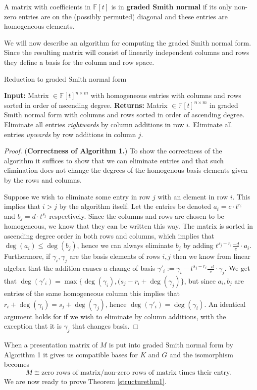 \begin{definition}
A matrix with coefficients in $\mathbb{F}[t]$ is in \textbf{graded Smith normal} if its only non-zero entries are on the (possibly permuted) diagonal and these entries are homogeneous elements.
\end{definition}

We will now describe an algorithm for computing the graded Smith normal form. Since the resulting matrix will consist of linearily independent columns and rows they define a basis for the column and row space.

\begin{algorithm}
\caption{Reduction to graded Smith normal form \cite{skraba, Zomorodian2005}}\label{smith}
\begin{algorithmic}[1]
  \State \textbf{Input:} Matrix $ \in \mathbb{F}[t]^{n \times m}$ with homogeneous entries with columns and rows sorted in order of ascending degree.
  \State \textbf{Returns:} Matrix $ \in \mathbb{F}[t]^{n \times m}$ in graded Smith normal form with columns and rows sorted in order of ascending degree.
  \State Eliminate all entries \textit{rightwards} by column additions in row $i$.
  \State Eliminate all entries \textit{upwards} by row additions in column $j$.
\end{algorithmic}
\end{algorithm}
\begin{proof}(\textbf{Correctness of Algorithm 1.})
  To show the correctness of the algorithm it suffices to show that we can eliminate entries and that such elimination does not change the degrees of the homogenous basis elements given by the rows and columns.

  Suppose we wish to eliminate some entry in row $j$ with an element in row $i$. This implies that $ i > j$ by the algorithm itself. Let the entries be denoted $a_{i}= c \cdot t^{r_{i}}$ and $b_{j} = d \cdot t^{s_{j}}$ respectively. Since the columns and rows are chosen to be homogeneous, we know that they can be written this way. The matrix is sorted in ascending degree order in both rows and columns, which implies that $\deg(a_{i}) \leq \deg(b_{j})$, hence we can always eliminate $b_{j}$ by adding $t^{s_{j}-r_{i}} \frac{-d}{c} \cdot a_{i}$. Furthermore, if $\gamma_{i},\gamma_{j}$ are the basis elements of rows $i,j$ then we know from linear algebra that the addition causes a change of basis $\gamma'_{i}:=\gamma_{i}-t^{s_{j}-r_{i}} \frac{-d}{c} \cdot \gamma_{j}$. We get that $\deg(\gamma'_{i})=\max\{\deg(\gamma_{i}), (s_{j}-r_{i}+\deg(\gamma_{j})\}$, but since $a_{i},b_{j}$ are entries of the same homogeneous column this implies that $r_{i} + \deg(\gamma_{i}) = s_{j} + \deg(\gamma_{j})$, hence $\deg(\gamma'_{i}) = \deg(\gamma_{i})$. An identical argument holds for if we wish to eliminate by column additions, with the exception that it is $\gamma_{j}$ that changes basis.
\end{proof}
When a presentation matrix of $M$ is put into graded Smith normal form by Algorithm 1 it gives us compatible bases for $K$ and $G$ and the isomorphism becomes \[M\cong \text{zero rows of matrix}/\text{non-zero rows of matrix times their entry}.\]
We are now ready to prove Theorem \ref{structurethm1}.

